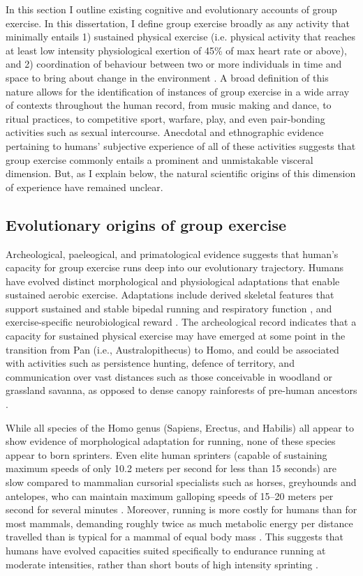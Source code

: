 \begin{CJK}{UTF8}{gbsn}
In this section I outline existing cognitive and evolutionary accounts of group exercise.  In this dissertation, I define group exercise broadly as any activity that minimally entails 1) sustained physical exercise (i.e. physical activity that reaches at least low intensity physiological exertion of 45\% of max heart rate or above), and 2) coordination of behaviour between two or more individuals in time and space to bring about change in the environment \citep[a.k.a., joint action, see][]{Sebanz2006,Vesper2010}.  A broad definition of this nature allows for the identification of instances of group exercise in a wide array of contexts throughout the human record, from music making and dance, to ritual practices, to competitive sport, warfare, play, and even pair-bonding activities such as sexual intercourse.  Anecdotal and ethnographic evidence pertaining to humans' subjective experience of all of these activities suggests that group exercise commonly entails a prominent and unmistakable visceral dimension. But, as I explain below, the natural scientific origins of this dimension of experience have remained unclear.


\subsection{Evolutionary origins of group exercise}
Archeological, paeleogical, and primatological evidence suggests that human’s capacity for group exercise runs deep into our evolutionary trajectory.  Humans have evolved distinct morphological and physiological adaptations that enable sustained aerobic exercise.  Adaptations include derived skeletal features that support sustained and stable bipedal running and respiratory function \citep[see ][]{Bramble2004}, and exercise-specific neurobiological reward \citep{Raichlen2012}.  The archeological record indicates that a capacity for sustained physical exercise may have emerged at some point in the transition from Pan (i.e., Australopithecus) to Homo, and could be associated with activities such as persistence hunting, defence of territory, and communication over vast distances such as those conceivable in woodland or grassland savanna, as opposed to dense canopy rainforests of pre-human ancestors \citep{Sands2012}.

While all species of the Homo genus (Sapiens, Erectus, and Habilis) all appear to show evidence of morphological adaptation for running, none of these species appear to born sprinters.  Even elite human sprinters (capable of sustaining maximum speeds of only 10.2 meters per second for less than 15 seconds) are slow compared to mammalian cursorial specialists such as horses, greyhounds and antelopes, who can maintain maximum galloping speeds of 15–20 meters per second for several minutes \citep{Garland1983}.  Moreover, running is more costly for humans than for most mammals, demanding roughly twice as much metabolic energy per distance travelled than is typical for a mammal of equal body mass \citep{Taylor1982}.  This suggests that humans have evolved capacities suited specifically to endurance running at moderate intensities, rather than short bouts of high intensity sprinting \citep{Bramble2004}.


\end{CJK}
